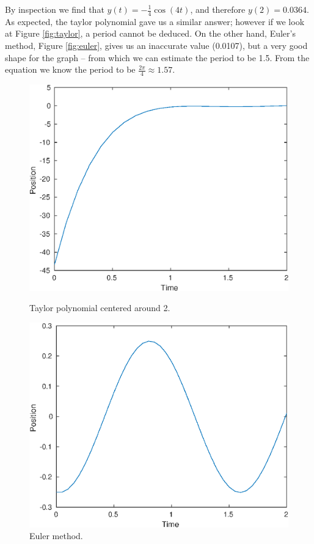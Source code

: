 By inspection we find that $y(t) = -\frac{1}{4} \cos\left(4t\right)$, and therefore $y(2) = 0.0364$.
As expected, the taylor polynomial gave us a similar answer; however if we look at Figure \ref{fig:taylor}, a period cannot be deduced.
On the other hand, Euler's method, Figure \ref{fig:euler}, gives us an inaccurate value (0.0107), but a very good shape for the graph -- from which we can estimate the period to be 1.5.
From the equation we know the period to be $\frac{2\pi}{4} \approx 1.57$.
\begin{figure}[h]
    \centering
    \begin{minipage}{0.45\textwidth}
        \includegraphics[scale=0.55, center]{./eps/topic8_a.eps}
        \caption{Taylor polynomial centered around 2.}
        \label{fig:taylor}
    \end{minipage}
    \begin{minipage}{0.45\textwidth}
        \includegraphics[scale=0.55, center]{./eps/topic8_b.eps}
        \caption{Euler method.}
        \label{fig:euler}
    \end{minipage}
    \label{}
\end{figure}

